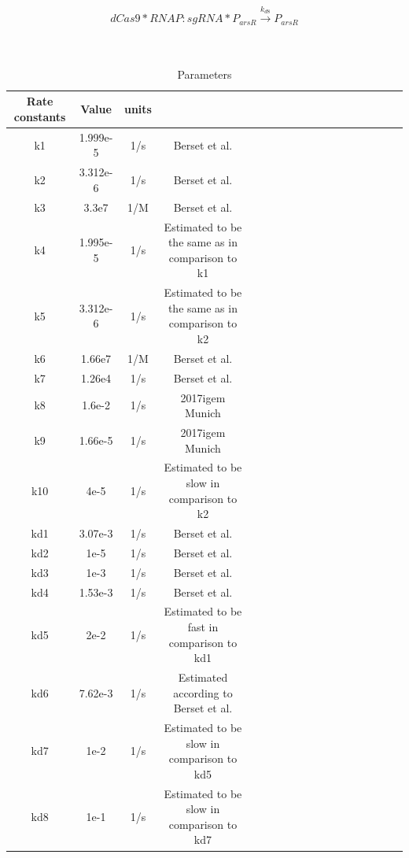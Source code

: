 
\begin{equation}
dCas9*RNAP:sgRNA*P_{arsR}\stackrel{k_{d8}}{\longrightarrow}P_{arsR}
\end{equation}
\\\\
\begin{table}[htbp]
	\centering
	\caption{\label {tab:test} Parameters}
	\begin{tabular}{cccccccccccccccccc}
		\toprule
		Rate constants & Value& units \\
		\midrule
		k1 & 1.999e-5 &1/s & Berset et al. \\
	k2 & 3.312e-6 &1/s & Berset et al.\\
	k3 & 3.3e7    & 1/M &Berset et al.   \\
	k4 &1.995e-5 &1/s & Estimated to be the same as in comparison to k1\\
	k5 & 3.312e-6 &1/s&Estimated to be the same as in comparison to k2\\
	k6 &1.66e7   &1/M & Berset et al.  \\
	k7  &1.26e4 &1/s & Berset et al. \\
	k8&1.6e-2& 1/s & 2017igem Munich\\
	k9 &1.66e-5&1/s&  2017igem Munich\\ 
	k10&4e-5&1/s & Estimated to be slow in comparison to k2 \\
	kd1 & 3.07e-3&1/s & Berset et al.\\
	kd2&1e-5&1/s & Berset et al.\\
	kd3&1e-3&1/s  & Berset et al.\\
	kd4&1.53e-3&1/s  & Berset et al.\\
	kd5 & 2e-2&1/s & Estimated to be fast in comparison to kd1\\
	kd6&7.62e-3&1/s&  Estimated according to Berset et al.\\
	kd7& 1e-2&1/s&  Estimated to be slow in comparison to kd5\\
	kd8&1e-1&1/s&  Estimated to be slow in comparison to kd7\\			
		\bottomrule
	\end{tabular}
\end{table}



